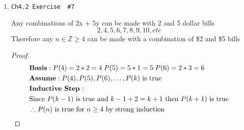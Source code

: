 \documentclass[11pt]{article}
\begin{document}
\begin{enumerate}
\begin{enumerate}
\begin{proof}
\begin{align*}
                        & \textbf{Basis}: P(30) = 4*2 + 11*2 = 30 \\
                        & P(31) = 4*5 + 11*1 = 31 \; P(32) = 4*8 + 11*0 = 32 \\
                        & P(33) = 4*0 + 11*3 = 33 \\
                        & \textbf{Assume}: P(k) = 4x + 11y = k \\
                        & \textbf{Inductive Step}: \\
                        & P(k+1) = P(k-3) + 4 \\
                        & \therefore P(k+1) \text{ is true} \\
                        & \therefore P(n) \text{ is true for $n\ge30$ by strong induction} \qedhere
                    \end{align*}
                \end{proof}
        \end{enumerate}

    \newpage

    \item \begin{verbatim}Ch4.2 Exercise  #7\end{verbatim}
        Any combinations of 2x + 5y can be made with 2 and 5 dollar bills
        $$2,4,5,6,7,8,9,10, etc$$
        Therefore any $n\in\mathbb{Z}\ge 4$ can be made with a combination of \$2 and
        \$5 bills
        \begin{proof}
            \begin{align*}
                & \textbf{Basis}: P(4) = 2*2 = 4 \; P(5) = 5*1 = 5 \; P(6) = 2*3 = 6\\
                & \textbf{Assume}: P(4), P(5), P(6),\dots,P(k) \text{ is true} \\
                & \textbf{Inductive Step}: \\
                & \text{Since $P(k-1)$ is true and $k-1 + 2 = k+1$ then $P(k+1)$ is true} \\
                & \therefore P(n) \text{ is true for $n\ge4$ by strong induction} \qedhere
            \end{align*}
        \end{proof}
    

\end{enumerate}
\end{document}
